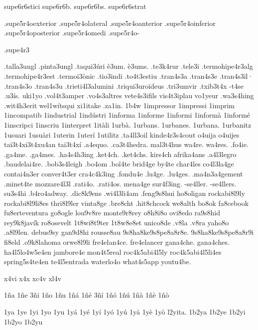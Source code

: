 {supe6r6stici
supe6r6b.
supe6r6bs.
supe6r6strat

.supe5r4oexterior
.supe5r4olateral
.supe5r4oanterior
.supe5r4oinferior
.supe5r4oposterior
.supe5r4omedi
.supe5r4o-

.supe4r3

.talla3ungl
.pinta3ungl
.taqui3úri
è3um.
è3ums.
.te3k4rur
.tele3i
.termohipe4r3alg
.termohipe4r3est
.termoi3ònic
.tio3indi
.to4t3estiu
.tran4s3a
.tran4s3e
.tran4s3il·
.tran4s3o
.tran4s3u
.trieti4l3alumini
.triqui3uroïdeus
.tri3umvir
.txib3t4x
-t4se
.u3ís.
uki1yo
.vol4t3amper
.vo4s3altres
vete4s3ifils
vis4t3iplau
vo1yeur
.wa3s4hing
.wit4h3erit
wel1wítsqui
xi1itake
.za1in.
1b4w 
1impressor
1impressi
1imprim
1incompatib
1industrial
1indústri
1informa
1informe
1informi
1informà
1informé
1inscripci
1inscriu
1interpret
1itàli
1urbà.
1urbans.
1urbanes.
1urbana.
1urbanitz
1usuari
1usuàri
1uterin
1uterí
1utilitz
.ta4ll3oil
kinde4r3s4cout
o4uija
o4uijes
tai3t4xi3t4xu4an
tai3t4xí
.a4equo.
.ca3t4hedra.
mal3t4hus
wa4re.
wa4res.
.fo4ie.
.ga4me.
.ga4mes.
.ha4s4h3ing
.ket4ch.
.ket4chs.
kirs4ch
afrika4ans
.a4l3legro
.baudelai4re.
.bob3s4leigh
.bo4om
.boî4te
brid4ge
by4te
char4les
co4l3la4ge
contai4n3er
conver4t3er
cra4c4k3ing
.fondu4e
.lu4ge.
.lu4ges.
.ma4n3a4gement
.minet4te
mozzare4l3l
.rati4o.
.rati4os.
mena4ge
sur4f3ing.
-se4ller.
-se4llers.
su3s4hi
.b4ro4adway.
.dic8k9ens
.wi4l3li4am
.feng9s8hui
ho8oligan
rockabi8l9ly
rockabi8l9li8es
thri8l9ler
vinta8ge
.bre8cht
.hit8chcock
we8alth
bo8ok
fa8cebook
fu8erteventura
go8ogle
lou9v8re
monte9r8rey
o8h8i8o
ovi8edo
ra9s8hid
rey9k8javík
ro8osevelt
1t8wi8t9ter
1t8w8e8et
unico8de
.v8la
.v8ra
yaho8o
.a8l9len.
debus9sy
gan9d8hi
rousse8au
9s8ha8ke9s8pe8a8r8e.
9s8ha8ke9s8pe8a8r9i
fi8eld
.o9k8lahoma
orwe8l9li
fre4elan4ce.
fre4elancer
gana4che.
gana4ches.
ha4l5lo4w5e4en
jambore4e
mon4t5real
roc4k5abi4l5ly
roc4k5abi4l5li4es
spring5s4te4en
te4l5entrada
waterlo4o
what4s5app
youtu4be.

x4vi
x4x
xc4v
xl4v

1ña 1ñe 3ñi 1ño 1ñu
1ñá 1ñé 3ñí 1ñó 1ñú
1ñà 1ñè 1ñò

1ya 1ye 1yi 1yo 1yu
1yá 1yé 1yí 1yó 1yú
1yà 1yè 1yò
l2yita. %
1b2ya 1b2ye 1b2yi 1b2yo 1b2yu


}
